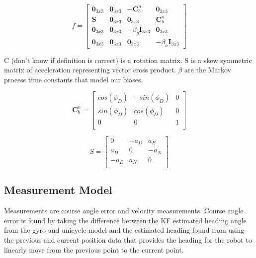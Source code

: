 \begin{equation}
  f = \begin{bmatrix}
        \boldsymbol{0}_{3x3} & \boldsymbol{0}_{3x3} & \boldsymbol{-C}^n_b & \boldsymbol{0}_{3x3} \\
        \boldsymbol{S} & \boldsymbol{0}_{3x3} & \boldsymbol{0}_{3x3} & \boldsymbol{C}^n_b \\
        \boldsymbol{0}_{3x3} & \boldsymbol{0}_{3x3} & -\beta_g\boldsymbol{I}_{3x3} & \boldsymbol{0}_{3x3} \\
        \boldsymbol{0}_{3x3} & \boldsymbol{0}_{3x3} & \boldsymbol{0}_{3x3} & -\beta_a\boldsymbol{I}_{3x3}
      \end{bmatrix}
\end{equation}

C (don't know if definition is correct) is a rotation matrix. S is a skew symmetric matrix of acceleration representing
vector cross product. $\beta$ are the Markov process time constants that model our
biases. 

\begin{equation}
  \boldsymbol{C}^n_b = \begin{bmatrix}
        cos(\phi_D) & -sin(\phi_D) & 0 \\
        sin(\phi_D) &  cos(\phi_D) & 0 \\
        0 & 0 & 1 \\
      \end{bmatrix}
\end{equation}

\begin{equation}
  S = \begin{bmatrix}
        0 & -a_D & a_E \\
        a_D & 0 & -a_N \\
        -a_E & a_N & 0 \\
      \end{bmatrix}
\end{equation}

\subsection{Measurement Model}

Measurements are course angle error and velocity measurements. Course angle error
is found by taking the difference between the KF estimated heading angle from the 
gyro and unicycle model and the estimated heading found from using the previous 
and current position data that provides the heading for the robot to linearly 
move from the previous point to the current point.

